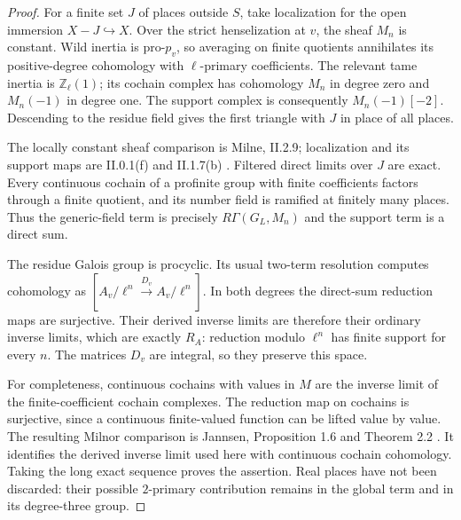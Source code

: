 \begin{proof}
For a finite set $J$ of places outside $S$, take localization for the open immersion $X-J\hookrightarrow X$. Over the strict henselization at $v$, the sheaf $M_n$ is constant. Wild inertia is pro-$p_v$, so averaging on finite quotients annihilates its positive-degree cohomology with $\ell$-primary coefficients. The relevant tame inertia is $\mathbb Z_\ell(1)$; its cochain complex has cohomology $M_n$ in degree zero and $M_n(-1)$ in degree one. The support complex is consequently $M_n(-1)[-2]$. Descending to the residue field gives the first triangle with $J$ in place of all places.

The locally constant sheaf comparison is Milne, II.2.9; localization and its support maps are II.0.1(f) and II.1.7(b) \cite{MilneADT}. Filtered direct limits over $J$ are exact. Every continuous cochain of a profinite group with finite coefficients factors through a finite quotient, and its number field is ramified at finitely many places. Thus the generic-field term is precisely $R\Gamma(G_L,M_n)$ and the support term is a direct sum.

The residue Galois group is procyclic. Its usual two-term resolution computes cohomology as $[A_v/\ell^n\xrightarrow{D_v}A_v/\ell^n]$. In both degrees the direct-sum reduction maps are surjective. Their derived inverse limits are therefore their ordinary inverse limits, which are exactly $R_A$: reduction modulo $\ell^n$ has finite support for every $n$. The matrices $D_v$ are integral, so they preserve this space.

For completeness, continuous cochains with values in $M$ are the inverse limit of the finite-coefficient cochain complexes. The reduction map on cochains is surjective, since a continuous finite-valued function can be lifted value by value. The resulting Milnor comparison is Jannsen, Proposition 1.6 and Theorem 2.2 \cite{Jannsen1988}. It identifies the derived inverse limit used here with continuous cochain cohomology. Taking the long exact sequence proves the assertion. Real places have not been discarded: their possible $2$-primary contribution remains in the global term and in its degree-three group.
\end{proof}

